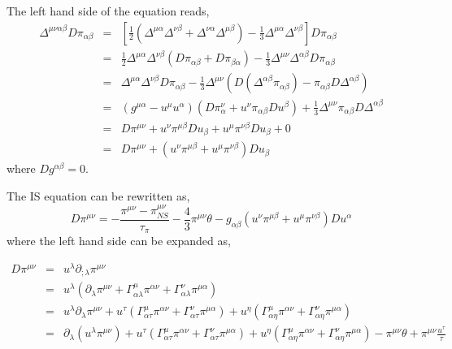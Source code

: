 \documentclass[11pt, oneside]{article}   	%
\begin{document}
The left hand side of the equation reads,
\begin{eqnarray}
\Delta^{\mu\nu\alpha\beta} D \pi_{\alpha \beta} &=& \left[ \frac{1}{2}(\Delta^{\mu\alpha} \Delta^{\nu\beta} + \Delta^{\nu\alpha} \Delta^{\mu\beta}) - \frac{1}{3}\Delta^{\mu\alpha} \Delta^{\nu\beta} \right] D\pi_{\alpha \beta} \\
&=& \frac{1}{2} \Delta^{\mu\alpha} \Delta^{\nu\beta} (D\pi_{\alpha \beta} + D\pi_{\beta\alpha}) - \frac{1}{3}\Delta^{\mu\nu} \Delta^{\alpha\beta} D\pi_{\alpha \beta} \\
&=& \Delta^{\mu\alpha} \Delta^{\nu\beta} D\pi_{\alpha \beta} - \frac{1}{3}\Delta^{\mu\nu} \left( D(\Delta^{\alpha\beta} \pi_{\alpha \beta}) - \pi_{\alpha \beta} D\Delta^{\alpha\beta}\right) \\
&=& (g^{\mu\alpha} - u^{\mu}u^{\alpha})(D\pi_{\alpha}^{\nu} + u^{\nu}\pi_{\alpha\beta}Du^{\beta}) + \frac{1}{3}\Delta^{\mu\nu} \pi_{\alpha \beta} D\Delta^{\alpha\beta} \\
&=& D\pi^{\mu\nu} + u^{\nu}\pi^{\mu\beta} Du_{\beta} + u^{\mu} \pi^{\nu\beta}Du_{\beta} + 0 \\
&=& D\pi^{\mu\nu} + (u^{\nu}\pi^{\mu\beta} + u^{\mu} \pi^{\nu\beta})Du_{\beta}
\end{eqnarray}
where $Dg^{\alpha\beta}=0$.

The IS equation can be rewritten as,
\begin{equation}
D\pi^{\mu\nu} = - \frac{\pi^{\mu\nu} - \pi_{NS}^{\mu\nu}}{\tau_{\pi}} - \frac{4}{3}\pi^{\mu\nu}\theta - g_{\alpha\beta}(u^{\nu}\pi^{\mu\beta} + u^{\mu} \pi^{\nu\beta})Du^{\alpha}
\end{equation}
where the left hand side can be expanded as,

\begin{eqnarray}
D\pi^{\mu\nu} &=& u^{\lambda}\partial_{;\lambda}\pi^{\mu\nu} \\
&=& u^{\lambda}\left( \partial_{\lambda}\pi^{\mu\nu} + \Gamma^{\mu}_{\alpha\lambda}\pi^{\alpha\nu} + \Gamma^{\nu}_{\alpha\lambda}\pi^{\mu\alpha}\right) \\
&=& u^{\lambda}\partial_{\lambda}\pi^{\mu\nu}  + u^{\tau}\left(\Gamma^{\mu}_{\alpha\tau}\pi^{\alpha\nu} + \Gamma^{\nu}_{\alpha\tau}\pi^{\mu\alpha}\right) + u^{\eta}\left(\Gamma^{\mu}_{\alpha\eta}\pi^{\alpha\nu} + \Gamma^{\nu}_{\alpha\eta}\pi^{\mu\alpha}\right) \\
&=& \partial_{\lambda}(u^{\lambda}\pi^{\mu\nu})  + u^{\tau}\left(\Gamma^{\mu}_{\alpha\tau}\pi^{\alpha\nu} + \Gamma^{\nu}_{\alpha\tau}\pi^{\mu\alpha}\right) + u^{\eta}\left(\Gamma^{\mu}_{\alpha\eta}\pi^{\alpha\nu} + \Gamma^{\nu}_{\alpha\eta}\pi^{\mu\alpha}\right) - \pi^{\mu\nu}\theta + \pi^{\mu\nu}\frac{u^{\tau}}{\tau}
\end{eqnarray}
\end{document}
